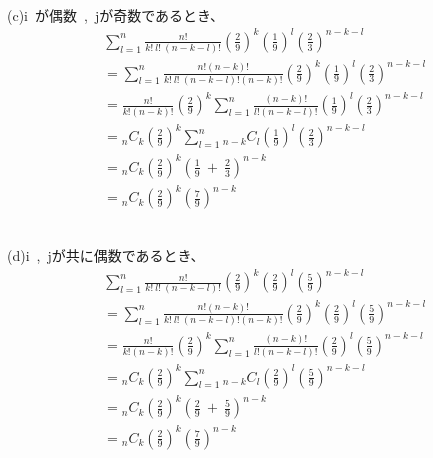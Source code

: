 \documentclass[12pt,a4paper]{jsarticle}
\begin{document}
~\\
(c)i~が偶数~,~jが奇数であるとき、\\
\begin{align*}
    & \sum^n_{l = 1} \frac{n!}{k!~l!~(n-k-l)!} \left(\frac{2}{9}\right)^k \left(\frac{1}{9}\right)^l \left(\frac{2}{3}\right)^{n-k-l} \\
    &= \sum^n_{l = 1} \frac{n!(n-k)!}{k!~l!~(n-k-l)!(n-k)!} \left(\frac{2}{9}\right)^k \left(\frac{1}{9}\right)^l \left(\frac{2}{3}\right)^{n-k-l} \\
    &= \frac{n!}{k!(n-k)!}\left(\frac{2}{9}\right)^k \sum^n_{l = 1}\frac{(n-k)!}{l!(n-k-l)!}\left(\frac{1}{9}\right)^l\left(\frac{2}{3}\right)^{n-k-l} \\
    &= {}_n C_k \left(\frac{2}{9}\right)^k \sum^n_{l = 1} {}_{n-k} C_l \left(\frac{1}{9}\right)^l\left(\frac{2}{3}\right)^{n-k-l} \\
    &= {}_n C_k \left(\frac{2}{9}\right)^k \left(\frac{1}{9}~+~\frac{2}{3}\right)^{n-k} \\
    &= {}_n C_k \left(\frac{2}{9}\right)^k \left(\frac{7}{9}\right)^{n-k}
\end{align*}

~\\
(d)i~,~jが共に偶数であるとき、\\
\begin{align*}
    & \sum^n_{l = 1} \frac{n!}{k!~l!~(n-k-l)!} \left(\frac{2}{9}\right)^k \left(\frac{2}{9}\right)^l \left(\frac{5}{9}\right)^{n-k-l} \\
    &= \sum^n_{l = 1} \frac{n!(n-k)!}{k!~l!~(n-k-l)!(n-k)!} \left(\frac{2}{9}\right)^k \left(\frac{2}{9}\right)^l \left(\frac{5}{9}\right)^{n-k-l} \\
    &= \frac{n!}{k!(n-k)!}\left(\frac{2}{9}\right)^k \sum^n_{l = 1}\frac{(n-k)!}{l!(n-k-l)!}\left(\frac{2}{9}\right)^l\left(\frac{5}{9}\right)^{n-k-l} \\
    &= {}_n C_k \left(\frac{2}{9}\right)^k \sum^n_{l = 1} {}_{n-k} C_l \left(\frac{2}{9}\right)^l\left(\frac{5}{9}\right)^{n-k-l} \\
    &= {}_n C_k \left(\frac{2}{9}\right)^k \left(\frac{2}{9}~+~\frac{5}{9}\right)^{n-k} \\
    &= {}_n C_k \left(\frac{2}{9}\right)^k \left(\frac{7}{9}\right)^{n-k}
\end{align*}
\end{document}
